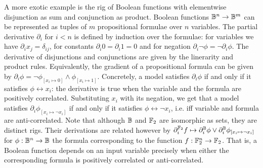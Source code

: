 A more exotic example is the rig of Boolean functions with elementwise disjunction as sum and conjunction as product.
Boolean functions $\mathbb{B}^n \to \mathbb{B}^m$ can be represented as tuples of $m$ propositional formulae over $n$ variables.
The partial derivative $\partial_i$ for $i < n$ is defined by induction over the formulae:
for variables we have $\partial_i x_j = \delta_{ij}$, for constants $\partial_i 0 = \partial_i 1 = 0$ and for negation $\partial_i \neg \phi = \neg \partial_i \phi$. The derivative of disjunctions and conjunctions are given by the linerarity and product rules.
Equivalently, the gradient of a propositional formula can be given by $\partial_i \phi = \neg \phi_{[x_i \mapsto 0]} \land \phi_{[x_i \mapsto 1]}$.
Concretely, a model satisfies $\partial_i \phi$ if and only if it satisfies $\phi \leftrightarrow x_i$: the derivative is true when the variable and the formula are positively correlated.
Substituting $x_i$ with its negation, we get that a model satisfies $\partial_i \phi_{[x_i \mapsto \neg x_i]}$ if and only if it satisfies $\phi \leftrightarrow \neg x_i$, i.e. iff variable and formula are anti-correlated.
Note that although $\mathbb{B}$ and $\mathbb{F}_2$ are isomorphic as sets, they are distinct rigs.
Their derivations are related however by $\partial^{\mathbb{F}_2}_i f \mapsto \partial^{\mathbb{B}}_i \phi \lor \partial^{\mathbb{B}}_i \phi_{[x_i \mapsto \neg x_i]}$ for $\phi : \mathbb{B}^n \to \mathbb{B}$ the formula corresponding to the function $f : \mathbb{F}_2^n \to \mathbb{F}_2$.
That is, a Boolean function depends on an input variable precisely when either the corresponding formula is positively correlated or anti-correlated.
